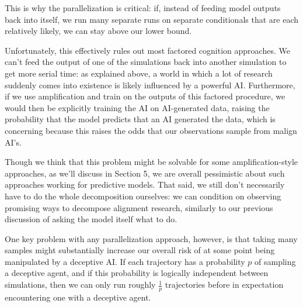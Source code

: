 {This is why the parallelization is critical: if, instead of feeding model outputs back into itself, we run many separate runs on separate conditionals that are each relatively likely, we can stay above our lower bound.

Unfortunately, this effectively rules out most factored cognition\cite{TODO: cite https://www.alignmentforum.org/tag/factored-cognition} approaches. We can't feed the output of one of the simulations back into another simulation to get more serial time: as explained above, a world in which a lot of research suddenly comes into existence is likely influenced by a powerful AI. Furthermore, if we use amplification and train on the outputs of this factored procedure, we would then be explicitly training the AI on AI-generated data, raising the probability that the model predicts that an AI generated the data, which is concerning because this raises the odds that our observations sample from malign AI's.

Though we think that this problem might be solvable for some amplification-style approaches, as we'll discuss in Section 5\cite{TODO: cite https://www.alignmentforum.org/posts/3ydumADYt9xkaKRTF/conditioning-predictive-models-interactions-with-other}, we are overall pessimistic about such approaches working for predictive models. That said, we still don't necessarily have to do the whole decomposition ourselves: we can condition on observing promising ways to decompose alignment research, similarly to our previous discussion of asking the model itself what to do.

One key problem with any parallelization approach, however, is that taking many samples might substantially increase our overall risk of at some point being manipulated by a deceptive AI. If each trajectory has a probability $p$ of sampling a deceptive agent, and if this probability is logically independent between simulations, then we can only run roughly $\frac{1}{p}$ trajectories before in expectation encountering one with a deceptive agent.

}
